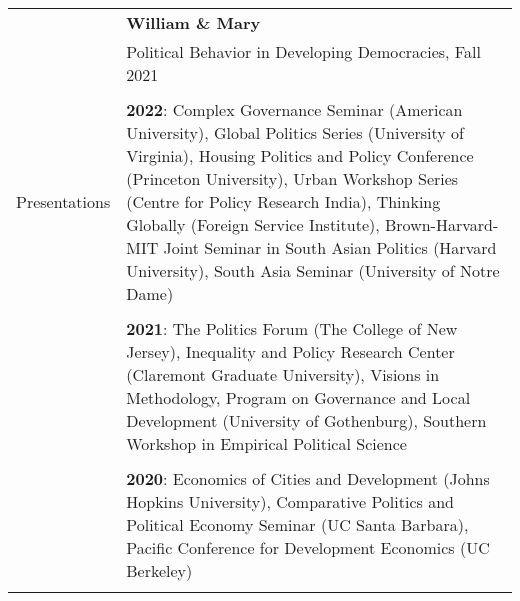 \documentclass[letterpaper, 11pt]{article}
\begin{document}
\begin{longtable}{p{1in}p{5.5in}}
& \textbf{William \& Mary} \\
&Political Behavior in Developing Democracies, Fall 2021 \\


&\\











{{Presentations}} 
& \textbf{2022}: Complex Governance Seminar (American University), Global Politics Series (University of Virginia), Housing Politics and Policy Conference (Princeton University), Urban Workshop Series (Centre for Policy Research India), Thinking Globally (Foreign Service Institute), Brown-Harvard-MIT Joint Seminar in South Asian Politics (Harvard University), South Asia Seminar (University of Notre Dame)\\
&\\

&\textbf{2021}: The Politics Forum (The College of New Jersey), Inequality and Policy Research Center (Claremont Graduate University),  Visions in Methodology, Program on Governance and Local Development (University of Gothenburg), Southern Workshop in Empirical Political Science \\
 
 &\\
 &\textbf{2020}: Economics of Cities and Development (Johns Hopkins University), Comparative Politics and Political Economy Seminar (UC Santa Barbara), Pacific Conference for Development Economics (UC Berkeley) \\
 &\\



\end{longtable}
\end{document}
